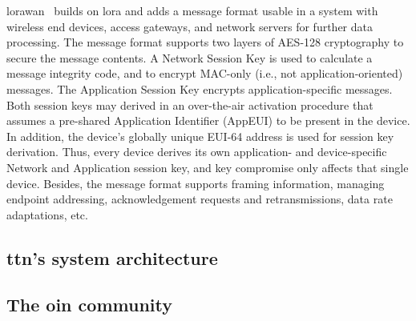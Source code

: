\gls{lorawan}~\cite{lorawan-specs} builds on \gls{lora} and adds
a message format usable in a system with wireless end devices,
access gateways, and network servers for further data processing.
The message format
supports two layers of AES-128 cryptography to secure
the message contents. A Network Session Key is used to calculate a
message integrity code, and to encrypt MAC-only (i.e., not
application-oriented) messages. The Application Session Key encrypts
application-specific messages. Both session keys may derived in an
over-the-air activation procedure that assumes a pre-shared
Application Identifier (AppEUI) to be present in the device.
In addition, the device's globally unique EUI-64 address is used
for session key derivation. Thus, every device derives its own
application- and device-specific Network and Application session key,
and key compromise only affects that single device.
Besides, the message format supports framing information, managing
endpoint addressing, acknowledgement requests and retransmissions,
data rate adaptations, etc.


\subsection{\gls{ttn}'s system architecture}


\subsection{The \gls{oin} community}
